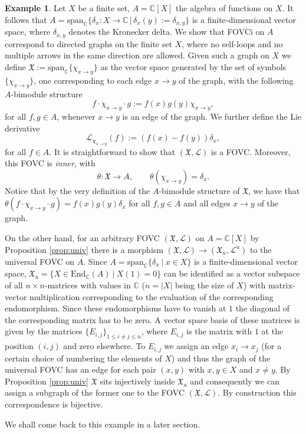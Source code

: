 \documentclass{article}
\theoremstyle{definition}
\newtheorem{example}[thm]{Example}
\newcommand{\C}{{\mathbb{C}}}
\newcommand{\lra}{{\longrightarrow}}
\newcommand{\ra}{{\rightarrow}}
\newcommand{\de}{{\delta}}
\newcommand{\Chi}{{\mathfrak{X}}}
\begin{document}
	\begin{example}
		\label{graph-calculus}
		Let $X$ be a finite set, $A=\C[X]$ the algebra of functions on $X$. It follows that $A=\mathrm{span}_{\mathbb{C}}\{\de_x:X \lra \C\,|\, \de_x(y):=\de_{x,y}\}$ is a finite-dimensional vector space, where $\de_{x,y}$ denotes the Kronecker delta. 
		We show that FOVCi on $A$ correspond to directed graphs on the finite set $X$, where no self-loops and no multiple arrows in the same direction are allowed. Given such a graph on $X$ we
		define $\Chi:=\mathrm{span}_\C \{\chi_{x\ra y}\}$ as the
		vector space generated by the set of symbols $\{\chi_{x\ra y}\}$, 
		one corresponding to each edge $x\to y$ of the graph, with the following $A$-bimodule structure
		\begin{equation}\label{graph:bimod}
			f \cdot \chi_{x\ra y} \cdot g:=f(x)g(y)\chi_{x \ra y},
		\end{equation}
		for all $f,g\in A$, whenever $x\to y$ is an edge of the graph.
		We further define the Lie derivative
		\begin{equation}\label{graph:LieDer}
			\mathscr{L}_{\chi_{x\ra y}}(f):=(f(x)-f(y))\de_x,
		\end{equation}
		for all $f\in A$.
		It is straightforward to show that $(\Chi, \mathscr{L})$ is a FOVC. Moreover, this FOVC is {\sl inner}, with 
		\begin{equation}
			\theta\colon \Chi \to A, \qquad \theta(\chi_{x\ra y})=\de_x.
		\end{equation}
		Notice that by the very definition of the $A$-bimodule structure of $\Chi$, we have that $\theta(f \cdot \chi_{x\ra y} \cdot g)=f(x)g(y)\de_x$ for all $f,g\in A$ and all edges $x\to y$ of the graph.
		
		On the other hand, for an arbitrary FOVC $(\mathfrak{X},\mathscr{L})$ on $A=\mathbb{C}[X]$ by Proposition \ref{prop:univ} there is a morphism $(\mathfrak{X},\mathscr{L})\to(\mathfrak{X}_u,\mathscr{L}^u)$ to the universal FOVC on $A$. Since $A=\mathrm{span}_\mathbb{C}\{\delta_x~|~x\in X\}$ is a finite-dimensional vector space, $\mathfrak{X}_u=\{X\in\mathrm{End}_\mathbb{C}(A)~|~X(1)=0\}$ can be identified as a vector subspace of all $n\times n$-matrices with values in $\mathbb{C}$ ($n=|X|$ being the size of $X$) with matrix-vector multiplication corresponding to the evaluation of the corresponding endomorphism. Since these endomorphisms have to vanish at $1$ the diagonal of the corresponding matrix has to be zero. A vector space basis of these matrices is given by the matrices $\{E_{i,j}\}_{1\leq i\neq j\leq n}$, where $E_{i,j}$ is the matrix with $1$ at the position $(i,j)$ and zero elsewhere. To $E_{i,j}$ we assign an edge $x_i\to x_j$ (for a certain choice of numbering the elements of $X$) and thus the graph of the universal FOVC has an edge for each pair $(x,y)$ with $x,y\in X$ and $x\neq y$. By Proposition \ref{prop:univ} $\mathfrak{X}$ sits injectively inside $\mathfrak{X}_u$ and consequently we can assign a subgraph of the former one to the FOVC $(\mathfrak{X},\mathscr{L})$. By construction this correspondence is bijective.
		
		We shall come back to this example in a later section.
	\end{example}
\end{document}
